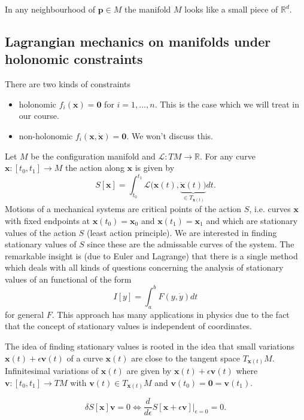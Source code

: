 \documentclass[hidelinks,a4paper, 11pt]{article}
\theoremstyle{plain}
\theoremstyle{break}
\theoremstyle{plain}
\theoremstyle{definition}
\begin{document}
{In any neighbourhood of $\mathbf p \in M$ the manifold $M$ looks like a small piece of $\mathbb R^d$.

\subsection{Lagrangian mechanics on manifolds under holonomic constraints}

There are two kinds of constraints
\begin{itemize}
	\item holonomic $f_i(\mathbf x) = \mathbf 0$ for $i = 1,...,n$. This is the case which we will treat in our course.
	\item non-holonomic $f_i (\mathbf x, \mathbf{\dot x}) = \mathbf 0 $. We won't discuss this.
\end{itemize}

 Let $M$ be the configuration manifold and $\mathcal L: TM \to \mathbb R$. For any curve $\mathbf x:[t_0,t_1] \to M$ the action along $\mathbf x$ is given by $$S[\mathbf x] = \int_{t_0}^{t_1}\mathcal L(\mathbf x(t), \underbrace{\mathbf{\dot x}(t))}_{\in T_{\mathbf x(t)}} dt.$$ 
 Motions of a mechanical systems are critical points of the action $S$, i.e. curves $\mathbf x$ with fixed endpoints  at $\mathbf x(t_0) = \mathbf x_0$ and $\mathbf x(t_1) = \mathbf x_1$ and which are stationary values of the action $S$ (least action principle). We are interested in finding stationary values of $S$ since these are the admissable curves of the system. The remarkable insight is (due to Euler and Lagrange) that there is a single method which deals with all kinds of questions concerning the analysis of stationary values of an functional of the form
 \[
 	I[y] = \int^b_a F(y, \dot y) dt
 \]
 for general $F$. This approach has many applications in physics due to the fact that the concept of stationary values is independent of coordinates.
 
 The idea of finding stationary values is rooted in the idea that small variations $\mathbf x(t) + \epsilon \mathbf v(t)$ of a curve $\mathbf x(t)$ are close to the tangent space $T_{\mathbf x(t)}M$. Infinitesimal variations of $\mathbf x(t)$ are given by $\mathbf x(t) + \epsilon \mathbf{v}(t)$ where $\mathbf v: [t_0,t_1] \to TM$ with $\mathbf v(t) \in T_{\mathbf x(t)}M$ and $\mathbf v(t_0) = \mathbf 0 = \mathbf v(t_1)$. 

\[
	\delta S[\mathbf x] \mathbf v  = 0 \iff \frac{d}{d\epsilon}S[\mathbf x + \epsilon \mathbf v] \Big |_{\epsilon = 0} = 0.
\]



}
\end{document}
